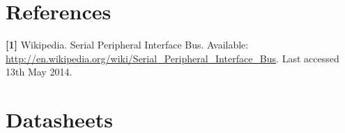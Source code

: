 
\raggedbottom


\pagestyle{empty}

\pagestyle{IHA}

\tableofcontents





\chapter{References}
\textbf{[1]} Wikipedia. Serial Peripheral Interface Bus. Available: \url{http://en.wikipedia.org/wiki/Serial\_Peripheral\_Interface\_Bus}. Last accessed 13th May 2014.\\

\chapter{Datasheets}


\listoffixmes
